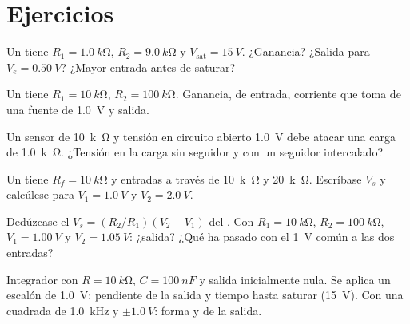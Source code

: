 \section{Ejercicios}

\begin{exercise}[$\star$]\label{exo:b1:operational-amplifier:1}
Un  tiene $R_1 = \qty{1.0}{k\ohm}$, $R_2 =
\qty{9.0}{k\ohm}$ y $V_{\mathrm{sat}} = \qty{15}{V}$. ¿Ganancia? ¿Salida
para $V_e = \qty{0.50}{V}$? ¿Mayor entrada antes de saturar?
\end{exercise}

\begin{exercise}[$\star$]\label{exo:b1:operational-amplifier:2}
Un  tiene $R_1 = \qty{10}{k\ohm}$, $R_2 = \qty{100}{k\ohm}$.
Ganancia,  de entrada, corriente que toma de una fuente de \qty{1.0}{V} y salida.
\end{exercise}

\begin{exercise}[$\star$]\label{exo:b1:operational-amplifier:3}
Un sensor de  \qty{10}{k\ohm} y tensión en circuito
abierto \qty{1.0}{V} debe atacar una carga de \qty{1.0}{k\ohm}. ¿Tensión
en la carga sin seguidor y con un seguidor intercalado?
\end{exercise}

\begin{exercise}[$\star$]\label{exo:b1:operational-amplifier:4}
Un  tiene $R_f = \qty{10}{k\ohm}$ y entradas a través
de \qty{10}{k\ohm} y \qty{20}{k\ohm}. Escríbase $V_s$ y calcúlese para
$V_1 = \qty{1.0}{V}$ y $V_2 = \qty{2.0}{V}$.
\end{exercise}

\begin{exercise}[$\star\star$]\label{exo:b1:operational-amplifier:5}
Dedúzcase el $V_s = (R_2/R_1)(V_2 - V_1)$ del . Con
$R_1 = \qty{10}{k\ohm}$, $R_2 = \qty{100}{k\ohm}$, $V_1 = \qty{1.00}{V}$ y
$V_2 = \qty{1.05}{V}$: ¿salida? ¿Qué ha pasado con el \qty{1}{V} común a
las dos entradas?
\end{exercise}

\begin{exercise}[$\star\star$]\label{exo:b1:operational-amplifier:6}
Integrador con $R = \qty{10}{k\ohm}$, $C = \qty{100}{nF}$ y salida
inicialmente nula. Se aplica un escalón de \qty{1.0}{V}: pendiente de la
salida y tiempo hasta saturar (\qty{15}{V}). Con una  cuadrada de
\qty{1.0}{kHz} y $\pm\qty{1.0}{V}$: forma y  de la salida.
\end{exercise}

